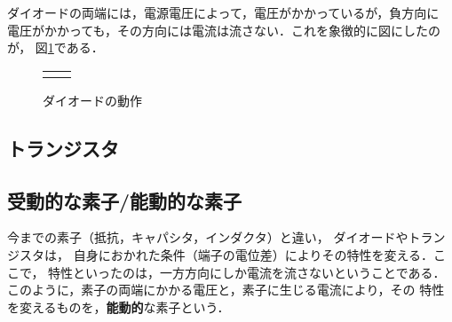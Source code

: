         ダイオードの両端には，電源電圧によって，電圧がかかっているが，負方向に
        電圧がかかっても，その方向には電流は流さない．これを象徴的に図にしたのが，
        図\ref{fig:Diode_Tokusei}である．
                \begin{figure}[hbt]
                    \begin{tabular}{cc}
                        \begin{minipage}{0.5\hsize}
                            \begin{center}
                                {Diode_kairo.pdf}
                                \caption{ダイオードを用いた電子回路}
                                \label{fig:Diode_kairo}
                            \end{center}
                        \end{minipage}
                        \begin{minipage}{0.5\hsize}
                            \begin{center}
                                {Diode_Tokusei.pdf}
                                \caption{ダイオードの動作}
                                \label{fig:Diode_Tokusei}
                            \end{center}
                        \end{minipage}
                    \end{tabular}
                \end{figure}

    \subsection{トランジスタ}

    \subsection{受動的な素子/能動的な素子}
        今までの素子（抵抗，キャパシタ，インダクタ）と違い，
        ダイオードやトランジスタは，
        自身におかれた条件（端子の電位差）によりその特性を変える．ここで，
        特性といったのは，一方方向にしか電流を流さないということである．
        このように，素子の両端にかかる電圧と，素子に生じる電流により，その
        特性を変えるものを，\textbf{能動的}な素子という．

